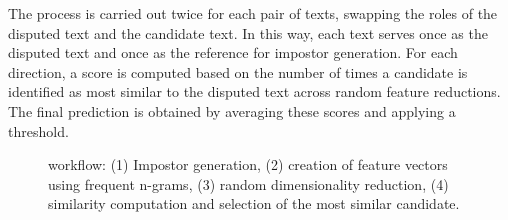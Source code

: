 The process is carried out twice for each pair of texts, swapping the roles of the disputed text and the candidate text. 
In this way, each text serves once as the disputed text and once as the reference for impostor generation. 
For each direction, a score is computed based on the number of times a candidate is identified as most similar to the disputed text across random feature reductions. 
The final prediction is obtained by averaging these scores and applying a threshold.


\begin{figure}[htbp]
    \centering
    
    \caption{\impAppr{} workflow: (1) Impostor generation, (2) creation of feature vectors using frequent n-grams, (3) random dimensionality reduction, (4) similarity computation and selection of the most similar candidate.}
    \label{fig:impostor}
\end{figure}









